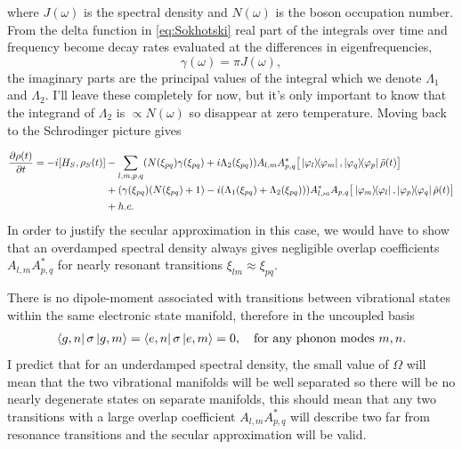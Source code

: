 \documentclass[]{article}
\begin{document}
where $J(\omega)$ is the spectral density and $N(\omega)$ is the boson occupation number. From the delta function in \ref{eq:Sokhotski} real part of the integrals over time and frequency become decay rates evaluated at the differences in eigenfrequencies,
\begin{equation}
\gamma(\omega)=\pi J(\omega),
\end{equation}
the imaginary parts are the principal values of the integral which we denote $\Lambda_1$ and $\Lambda_2$. I'll leave these completely for now, but it's only important to know that the integrand of $\Lambda_2$ is $ \propto N(\omega)$ so disappear at zero temperature.
Moving back to the Schrodinger picture gives

\begin{align}
	\label{eq:VibronicNonSecular1}
	\begin{split}
		\pdv{\rho(t)}{t} = -i[H_S, \rho_S(t)] &- \sum_{l,m,p,q}  (N(\xi_{pq})\gamma(\xi_{pq})+i\Lambda_2(\xi_{pq})) A_{l,m}A_{p,q}^{*}\big[\dyad{\varphi_l}{\varphi_m}, \dyad{\varphi_q}{\varphi_p}\tilde{\rho}(t)\big] \\
		&+ (\gamma(\xi_{pq})(N(\xi_{pq})+1)-i(\Lambda_1(\xi_{pq})+\Lambda_2(\xi_{pq})))  A_{l,m}^{*}A_{p,q}\big[\dyad{\varphi_m}{\varphi_l}, \dyad{\varphi_p}{\varphi_q}\tilde{\rho}(t)\big]\\ &+ h.c.
	\end{split}
\end{align}
In order to justify the secular approximation in this case, we would have to show that an overdamped spectral density always gives negligible overlap coefficients $A_{l,m}A_{p,q}^{*}$ for nearly resonant transitions $\xi_{lm}\approx \xi_{pq}$.

There is no dipole-moment associated with transitions between vibrational states within the same electronic state manifold, therefore in the uncoupled basis
\begin{align}
	\begin{split}
		\bra{g,n}\sigma\ket{g,m} = \bra{e,n}\sigma\ket{e,m} = 0, \quad \textnormal{for any phonon modes } m,n.
	\end{split}
\end{align}
I predict that for an underdamped spectral density, the small value of $\Omega$ will mean that the two vibrational manifolds will be well separated so there will be no nearly degenerate states on separate manifolds, this should mean that any two transitions with a large overlap coefficient $A_{l,m}A_{p,q}^{*}$ will describe two far from resonance transitions and the secular approximation will be valid.
\end{document}
